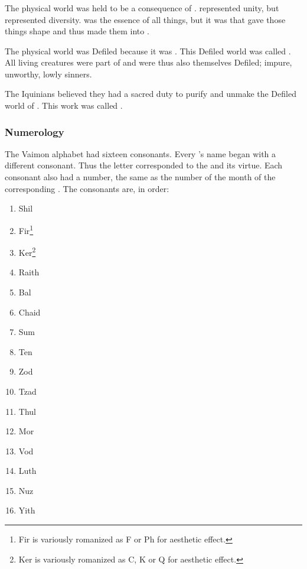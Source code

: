 \subsubsection{\Gehinnom}
The physical world was held to be a consequence of \itzach. 
\Iquin represented unity, but \itzach represented diversity. 
\Iquin was the essence of all things, but it was \itzach that gave those things shape and thus made them into .

The physical world was Defiled because it was . 
This Defiled world was called \Gehinnom. 
All living creatures were part of \Gehinnom and were thus also themselves Defiled; impure, unworthy, lowly sinners. 

The Iquinians believed they had a sacred duty to purify and unmake the Defiled world of \Gehinnom. 
This work was called .





\subsubsection{Numerology}
The Vaimon alphabet had sixteen consonants.
Every \sephirah's name began with a different consonant. 
Thus the letter corresponded to the \sephirah and its virtue. 
Each consonant also had a number, the same as the number of the month of the corresponding \sephirah.
The consonants are, in order: 
\begin{enumerate}
  \item Shil
  \item Fir\footnote{Fir is variously romanized as F or Ph for aesthetic effect.}
  \item Ker\footnote{Ker is variously romanized as C, K or Q for aesthetic effect.}
  \item Raith
  
  \item Bal
  \item Chaid
  \item Sum
  \item Ten
  
  \item Zod
  \item Tzad
  \item Thul
  \item Mor
  
  \item Vod
  \item Luth
  \item Nuz
  \item Yith
\end{enumerate}


